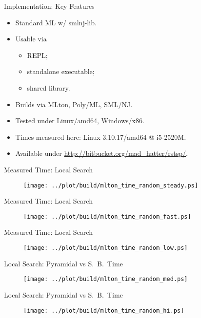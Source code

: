 \documentclass[
  size=8pt,
  style=klope,
  paper=screen,
  mode=present,
  nohandoutpagebreaks,
  pauseslide,
  hlsections,
  fleqn,
]{powerdot}
\begin{document}
\begin{slide}[toc=Key Features]{Implementation: Key Features}
  \begin{itemize}
  \item
  Standard ML w/ smlnj-lib.
  \item
  Usable via
  \begin{itemize}
    \item REPL;
    \item standalone executable;
    \item shared library.
  \end{itemize}
  \item
  Builds via MLton, Poly/ML, SML/NJ.
  \item
  Tested under Linux/{\ttfamily amd64}, Windows/{\ttfamily x86}.
  \item
    Times measured here:
    Linux 3.10.17/{\ttfamily amd64} @ i5-2520M.
  \item
  Available under
    \url{http://bitbucket.org/mad_hatter/rstsp/}.
  \end{itemize}
\end{slide}

\begin{slide}[toc=Benchmarks: Time]{Measured Time: Local Search}
  \begin{figure}[H]
    \centering
      \texttt{[image: ../plot/build/mlton\_time\_random\_steady.ps]}
  \end{figure}
\end{slide}
\begin{slide}[toc=]{Measured Time: Local Search}
  \begin{figure}[H]
    \centering
      \texttt{[image: ../plot/build/mlton\_time\_random\_fast.ps]}
  \end{figure}
\end{slide}
\begin{slide}[toc=]{Measured Time: Local Search}
  \begin{figure}[H]
    \centering
      \texttt{[image: ../plot/build/mlton\_time\_random\_low.ps]}
  \end{figure}
\end{slide}
\begin{slide}[toc=]{Local Search: Pyramidal vs S.\ B.\ Time}
  \begin{figure}[H]
    \centering
      \texttt{[image: ../plot/build/mlton\_time\_random\_med.ps]}
  \end{figure}
\end{slide}
\begin{slide}[toc=]{Local Search: Pyramidal vs S.\ B.\ Time}
  \begin{figure}[H]
    \centering
      \texttt{[image: ../plot/build/mlton\_time\_random\_hi.ps]}
  \end{figure}
\end{slide}
\end{document}
